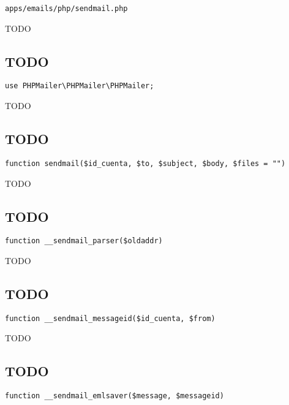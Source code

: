 \documentclass[a4paper]{book}
\begin{document}
\begin{lstlisting}
apps/emails/php/sendmail.php
\end{lstlisting}

TODO

\hypertarget{toc561}{}
\subsection{TODO}

\begin{lstlisting}
use PHPMailer\PHPMailer\PHPMailer;
\end{lstlisting}

TODO

\hypertarget{toc562}{}
\subsection{TODO}

\begin{lstlisting}
function sendmail($id_cuenta, $to, $subject, $body, $files = "")
\end{lstlisting}

TODO

\hypertarget{toc563}{}
\subsection{TODO}

\begin{lstlisting}
function __sendmail_parser($oldaddr)
\end{lstlisting}

TODO

\hypertarget{toc564}{}
\subsection{TODO}

\begin{lstlisting}
function __sendmail_messageid($id_cuenta, $from)
\end{lstlisting}

TODO

\hypertarget{toc565}{}
\subsection{TODO}

\begin{lstlisting}
function __sendmail_emlsaver($message, $messageid)
\end{lstlisting}
\end{document}
